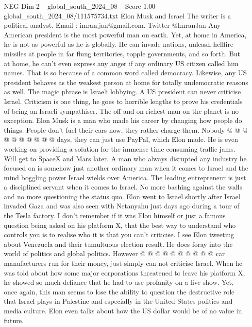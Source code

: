 \begin{textsample}{NEG Dim 2 – global\_south\_2024\_08 – Score 1.00 – global\_south\_2024\_08/111575734.txt}  \label{ex:f2_neg_424}
Elon Musk and Israel The writer is a political analyst.
Email : imran.jan@gmail.com.
Twitter @ImranJan Any American president is the most powerful man on earth.
Yet, at home in America, he is not as powerful as he is globally.
He can invade nations, unleash hellfire missiles at people in far flung territories, topple governments, and so forth.
But at home, he can't even express any anger if any ordinary US citizen called him names.
That is so because of a common word called democracy.
Likewise, any US president behaves as the weakest person at home for totally undemocratic reasons as well.
The magic phrase is Israeli lobbying.
A US president can never criticise Israel.
Criticism is one thing, he goes to horrible lengths to prove his credentials of being an Israeli sympathiser.
The off and on richest man on the planet is no exception.
Elon Musk is a man who made his career by changing how people do things.
People don't fuel their cars now, they rather charge them.
Nobody @ @ @ @ @ @ @ @ @ @ days, they can just use PayPal, which Elon made.
He is even working on providing a solution for the immense time consuming traffic jams.
Will get to SpaceX and Mars later.
A man who always disrupted any industry he focused on is somehow just another ordinary man when it comes to Israel and the mind boggling power Israel wields over America.
The leading entrepreneur is just a disciplined servant when it comes to Israel.
No more bashing against the walls and no more questioning the status quo.
Elon went to Israel shortly after Israel invaded Gaza and was also seen with Netanyahu just days ago during a tour of the Tesla factory.
I don't remember if it was Elon himself or just a famous question being asked on his platform X, that the best way to understand who controls you is to realise who it is that you can't criticise.
I see Elon tweeting about Venezuela and their tumultuous election result.
He does foray into the world of politics and global politics.
However @ @ @ @ @ @ @ @ @ @ car manufacturers run for their money, just simply can not criticise Israel.
When he was told about how some major corporations threatened to leave his platform X, he showed so much defiance that he had to use profanity on a live show.
Yet, once again, this man seems to lose the ability to question the destructive role that Israel plays in Palestine and especially in the United States politics and media culture.
Elon even talks about how the US dollar would be of no value in future.

\end{textsample}
